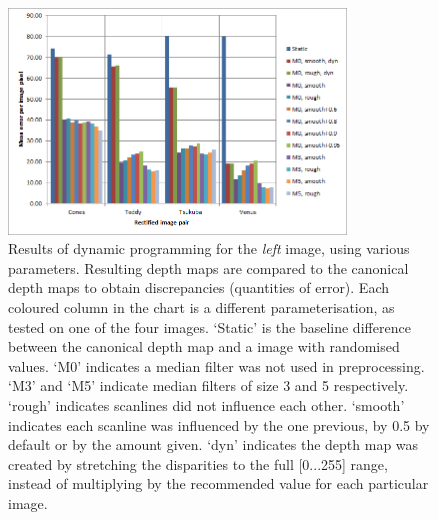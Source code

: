 \begin{figure}[h]
  \centering
  \includegraphics[width=0.8\textwidth]{Stereo-left-report}
  \caption[Results of dynamic programming (left image)]{Results of dynamic programming for the \emph{left} image, using various parameters. Resulting depth maps are compared to the canonical depth maps to obtain discrepancies (quantities of error). Each coloured column in the chart is a different parameterisation, as tested on one of the four images. `Static' is the baseline difference between the canonical depth map and a image with randomised values. `M0' indicates a median filter was not used in preprocessing. `M3' and `M5' indicate median filters of size 3 and 5 respectively. `rough' indicates scanlines did not influence each other. `smooth' indicates each scanline was influenced by the one previous, by 0.5 by default or by the amount given. `dyn' indicates the depth map was created by stretching the disparities to the full [0...255] range, instead of multiplying by the recommended value for each particular image.}
  \label{fig:stereo-left}
\end{figure}

